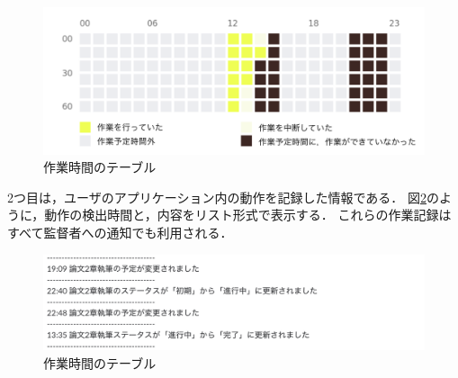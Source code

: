 \begin{figure}[h]
  \begin{center}
  \includegraphics[width=12.0cm]{graphics/activity_table.png}
  \caption{作業時間のテーブル}
  \label{fig:activity_table}
  \end{center}
\end{figure}

\clearpage

2つ目は，ユーザのアプリケーション内の動作を記録した情報である．
図\ref{fig:activity_log}のように，動作の検出時間と，内容をリスト形式で表示する．
これらの作業記録はすべて監督者への通知でも利用される．

\begin{figure}[h]
  \begin{center}
  \includegraphics[width=14.0cm]{graphics/activity_log.png}
  \caption{作業時間のテーブル}
  \label{fig:activity_log}
  \end{center}
\end{figure}
